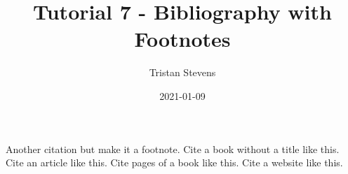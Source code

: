 \documentclass{article}
\title{Tutorial 7 - Bibliography with Footnotes}
\date{2021-01-09}
\author{Tristan Stevens}
\begin{document}
\maketitle
\newpage

Another citation \autocite[23]{DUMMY:1} but make it a footnote.
Cite a book without a title \autocite{BOOK:2} like this.
Cite an article \autocite{ARTICLE:1} like this.
Cite pages of a book \autocite{BOOK:2} like this.
Cite a website \autocite{WEBSITE:1} like this.

\newpage

\printbibliography
\end{document}
